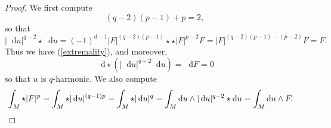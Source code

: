 \documentclass[reqno,11pt]{amsart}
\newcommand{\RR}{\mathbf{R}}
\newcommand*\dif{\mathop{}\!\mathrm{d}}
\newtheorem{proposition}[theorem]{Proposition}
\theoremstyle{definition}
\numberwithin{equation}{section}
\begin{document}
\begin{proof}
We first compute 
$$(q - 2)(p - 1) + p = 2,$$
so that
$$|\dif u|^{q - 2} \star \dif u = (-1)^{d - 1} |F|^{(q - 2)(p - 1)} \star \star |F|^{p - 2} F = |F|^{(q - 2)(p - 1) - (p - 2)} F = F.$$
Thus we have (\ref{extremality}), and moreover,
$$\dif \star (|\dif u|^{q - 2} \dif u) = \dif F = 0$$
so that $u$ is $q$-harmonic.
We also compute 
\begin{align*}
\int_M \star |F|^p &= \int_M \star |\dif u|^{(q - 1)p} = \int_M \star |\dif u|^q = \int_M \dif u \wedge |\dif u|^{q - 2} \star \dif u = \int_M \dif u \wedge F. \qedhere 
\end{align*}
\end{proof}




\end{document}
